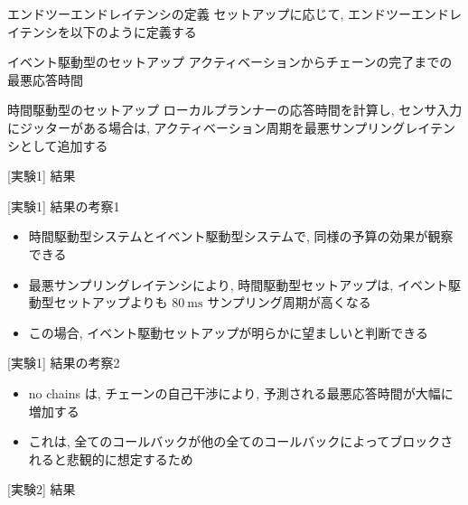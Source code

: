 \begin{frame}{エンドツーエンドレイテンシの定義}
    セットアップに応じて, エンドツーエンドレイテンシを以下のように定義する
    \begin{block}{イベント駆動型のセットアップ}
        アクティベーションからチェーンの完了までの最悪応答時間
    \end{block}
    \begin{block}{時間駆動型のセットアップ}
        ローカルプランナーの応答時間を計算し, センサ入力にジッターがある場合は, アクティベーション周期を最悪サンプリングレイテンシとして追加する
    \end{block}
\end{frame}


\begin{frame}{[実験1] 結果}
\end{frame}

\begin{frame}{[実験1] 結果の考察1}
    \begin{itemize}
        \item 時間駆動型システムとイベント駆動型システムで, 同様の予算の効果が観察できる
        \item 最悪サンプリングレイテンシにより, 時間駆動型セットアップは, イベント駆動型セットアップよりも $80 \mathrm{~ms}$ サンプリング周期が高くなる
        \item この場合, イベント駆動セットアップが明らかに望ましいと判断できる
    \end{itemize}
\end{frame}

\begin{frame}{[実験1] 結果の考察2}
    \begin{itemize}
        \item no chains は, チェーンの自己干渉により, 予測される最悪応答時間が大幅に増加する
        \item これは, 全てのコールバックが他の全てのコールバックによってブロックされると悲観的に想定するため
    \end{itemize}
\end{frame}

\begin{frame}{[実験2] 結果}
\end{frame}

